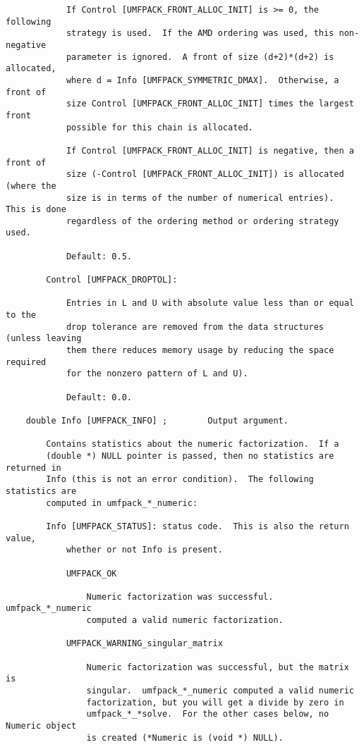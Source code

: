 \documentclass[11pt]{article}
\begin{document}
{\begin{verbatim}
            If Control [UMFPACK_FRONT_ALLOC_INIT] is >= 0, the following
            strategy is used.  If the AMD ordering was used, this non-negative
            parameter is ignored.  A front of size (d+2)*(d+2) is allocated,
            where d = Info [UMFPACK_SYMMETRIC_DMAX].  Otherwise, a front of
            size Control [UMFPACK_FRONT_ALLOC_INIT] times the largest front
            possible for this chain is allocated.

            If Control [UMFPACK_FRONT_ALLOC_INIT] is negative, then a front of
            size (-Control [UMFPACK_FRONT_ALLOC_INIT]) is allocated (where the
            size is in terms of the number of numerical entries).  This is done
            regardless of the ordering method or ordering strategy used.

            Default: 0.5.

        Control [UMFPACK_DROPTOL]:

            Entries in L and U with absolute value less than or equal to the
            drop tolerance are removed from the data structures (unless leaving
            them there reduces memory usage by reducing the space required
            for the nonzero pattern of L and U).

            Default: 0.0.

    double Info [UMFPACK_INFO] ;        Output argument.

        Contains statistics about the numeric factorization.  If a
        (double *) NULL pointer is passed, then no statistics are returned in
        Info (this is not an error condition).  The following statistics are
        computed in umfpack_*_numeric:

        Info [UMFPACK_STATUS]: status code.  This is also the return value,
            whether or not Info is present.

            UMFPACK_OK

                Numeric factorization was successful.  umfpack_*_numeric
                computed a valid numeric factorization.

            UMFPACK_WARNING_singular_matrix

                Numeric factorization was successful, but the matrix is
                singular.  umfpack_*_numeric computed a valid numeric
                factorization, but you will get a divide by zero in
                umfpack_*_*solve.  For the other cases below, no Numeric object
                is created (*Numeric is (void *) NULL).


\end{verbatim}}
\end{document}
